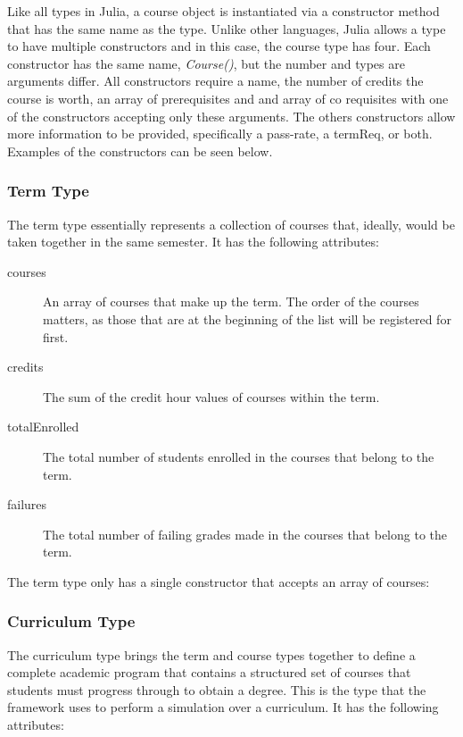 \documentclass[botnum, fleqn]{unmeethesis}
\begin{document}
    Like all types in Julia, a course object is instantiated via a constructor method that has the same name as the type. Unlike other languages, Julia allows a type to have multiple constructors and in this case, the course type has four. Each constructor has the same name, \textit{Course()}, but the number and types are arguments differ. All constructors require a name, the number of credits the course is worth, an array of prerequisites and and array of co requisites with one of the constructors accepting only these arguments. The others constructors allow more information to be provided, specifically a pass-rate, a termReq, or both. Examples of the constructors can be seen below.

    

    \subsubsection{Term Type}
    The term type essentially represents a collection of courses that, ideally, would be taken together in the same semester. It has the following attributes:

    \begin{description}
      \item [courses] An array of courses that make up the term. The order of the courses matters, as those that are at the beginning of the list will be registered for first.
      \item [credits] The sum of the credit hour values of courses within the term.
      \item [totalEnrolled] The total number of students enrolled in the courses that belong to the term.
      \item [failures] The total number of failing grades made in the courses that belong to the term.
    \end{description}

    The term type only has a single constructor that accepts an array of courses:

    

    \subsubsection{Curriculum Type}
    The curriculum type brings the term and course types together to define a complete academic program that contains a structured set of courses that students must progress through to obtain a degree. This is the type that the framework uses to perform a simulation over a curriculum. It has the following attributes:
\end{document}
